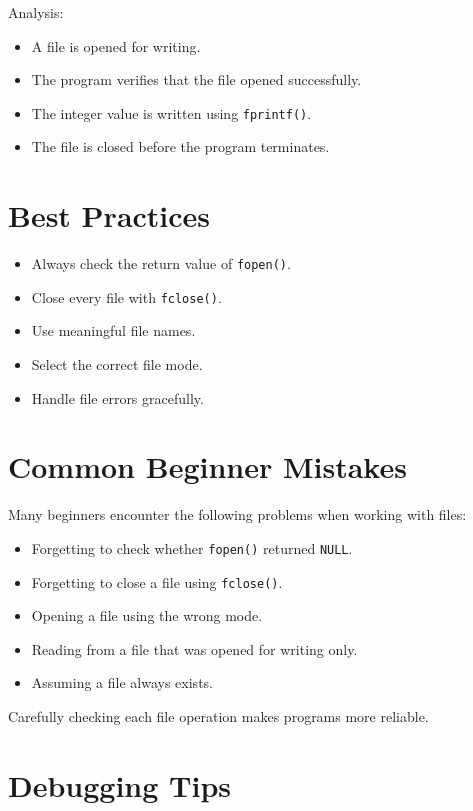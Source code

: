 \documentclass[12pt,openany]{book}
\begin{document}
Analysis:

\begin{itemize}
    \item A file is opened for writing.
    \item The program verifies that the file opened successfully.
    \item The integer value is written using \texttt{fprintf()}.
    \item The file is closed before the program terminates.
\end{itemize}

\section{Best Practices}

\begin{itemize}
    \item Always check the return value of \texttt{fopen()}.
    \item Close every file with \texttt{fclose()}.
    \item Use meaningful file names.
    \item Select the correct file mode.
    \item Handle file errors gracefully.
\end{itemize}
\section{Common Beginner Mistakes}

Many beginners encounter the following problems when working with files:

\begin{itemize}
    \item Forgetting to check whether \texttt{fopen()} returned \texttt{NULL}.
    \item Forgetting to close a file using \texttt{fclose()}.
    \item Opening a file using the wrong mode.
    \item Reading from a file that was opened for writing only.
    \item Assuming a file always exists.
\end{itemize}

Carefully checking each file operation makes programs more reliable.

\section{Debugging Tips}
\end{document}
